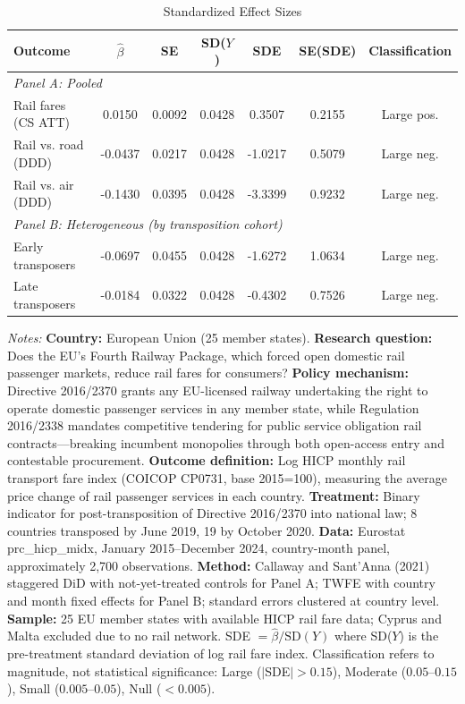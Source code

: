 \begin{table}[htbp]
\centering
\caption{Standardized Effect Sizes}
\label{tab:sde}
\begin{tabular}{lcccccc}
\hline\hline
Outcome & $\hat{\beta}$ & SE & SD($Y$) & SDE & SE(SDE) & Classification \\
\hline
\multicolumn{7}{l}{\textit{Panel A: Pooled}} \\[3pt]
Rail fares (CS ATT) & 0.0150 & 0.0092 & 0.0428 & 0.3507 & 0.2155 & Large pos. \\
Rail vs. road (DDD) & -0.0437 & 0.0217 & 0.0428 & -1.0217 & 0.5079 & Large neg. \\
Rail vs. air (DDD) & -0.1430 & 0.0395 & 0.0428 & -3.3399 & 0.9232 & Large neg. \\

\multicolumn{7}{l}{\textit{Panel B: Heterogeneous (by transposition cohort)}} \\[3pt]
Early transposers & -0.0697 & 0.0455 & 0.0428 & -1.6272 & 1.0634 & Large neg. \\
Late transposers & -0.0184 & 0.0322 & 0.0428 & -0.4302 & 0.7526 & Large neg. \\
\hline\hline
\end{tabular}
\begin{tablenotes}[flushleft]\footnotesize
\item \textit{Notes:} \textbf{Country:} European Union (25 member states). \textbf{Research question:} Does the EU's Fourth Railway Package, which forced open domestic rail passenger markets, reduce rail fares for consumers? \textbf{Policy mechanism:} Directive 2016/2370 grants any EU-licensed railway undertaking the right to operate domestic passenger services in any member state, while Regulation 2016/2338 mandates competitive tendering for public service obligation rail contracts---breaking incumbent monopolies through both open-access entry and contestable procurement. \textbf{Outcome definition:} Log HICP monthly rail transport fare index (COICOP CP0731, base 2015=100), measuring the average price change of rail passenger services in each country. \textbf{Treatment:} Binary indicator for post-transposition of Directive 2016/2370 into national law; 8 countries transposed by June 2019, 19 by October 2020. \textbf{Data:} Eurostat prc\_hicp\_midx, January 2015--December 2024, country-month panel, approximately 2,700 observations. \textbf{Method:} Callaway and Sant'Anna (2021) staggered DiD with not-yet-treated controls for Panel A; TWFE with country and month fixed effects for Panel B; standard errors clustered at country level. \textbf{Sample:} 25 EU member states with available HICP rail fare data; Cyprus and Malta excluded due to no rail network. SDE $= \hat{\beta} / \text{SD}(Y)$ where SD($Y$) is the pre-treatment standard deviation of log rail fare index. Classification refers to magnitude, not statistical significance: Large ($|$SDE$| > 0.15$), Moderate ($0.05$--$0.15$), Small ($0.005$--$0.05$), Null ($< 0.005$).
\end{tablenotes}
\end{table}

